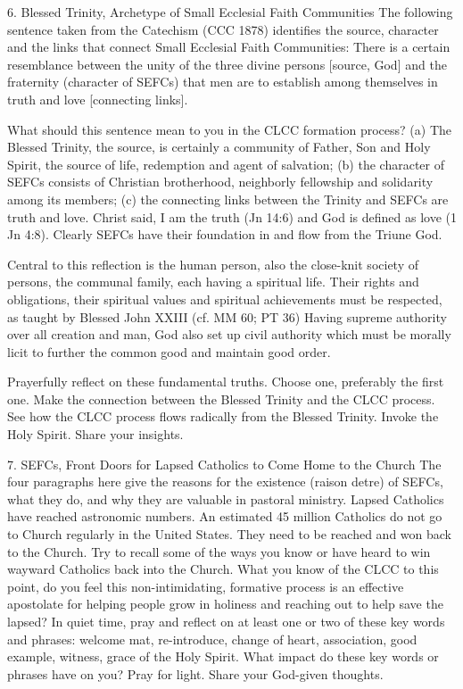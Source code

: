 \documentclass[oneside]{book}
\begin{document}
6. Blessed Trinity, Archetype of Small Ecclesial Faith Communities The following
sentence taken from the Catechism (CCC 1878) identifies the source, character
and the links that connect Small Ecclesial Faith Communities: There is a certain
resemblance between the unity of the three divine persons [source, God] and the
fraternity (character of SEFCs) that men are to establish among themselves in
truth and love [connecting links].

What should this sentence mean to you in the CLCC formation process? (a) The
Blessed Trinity, the source, is certainly a community of Father, Son and Holy
Spirit, the source of life, redemption and agent of salvation; (b) the character
of SEFCs consists of Christian brotherhood, neighborly fellowship and solidarity
among its members; (c) the connecting links between the Trinity and SEFCs are
truth and love. Christ said, I am the truth (Jn 14:6) and God is defined as love
(1 Jn 4:8). Clearly SEFCs have their foundation in and flow from the Triune God.

Central to this reflection is the human person, also the close-knit society of
persons, the communal family, each having a spiritual life. Their rights and
obligations, their spiritual values and spiritual achievements must be
respected, as taught by Blessed John XXIII (cf. MM 60; PT 36) Having supreme
authority over all creation and man, God also set up civil authority which must
be morally licit to further the common good and maintain good order.

Prayerfully reflect on these fundamental truths. Choose one, preferably the
first one. Make the connection between the Blessed Trinity and the CLCC
process. See how the CLCC process flows radically from the Blessed
Trinity. Invoke the Holy Spirit. Share your insights.

7. SEFCs, Front Doors for Lapsed Catholics to Come Home to the Church The four
paragraphs here give the reasons for the existence (raison detre) of SEFCs, what
they do, and why they are valuable in pastoral ministry. Lapsed Catholics have
reached astronomic numbers. An estimated 45 million Catholics do not go to
Church regularly in the United States. They need to be reached and won back to
the Church. Try to recall some of the ways you know or have heard to win wayward
Catholics back into the Church. What you know of the CLCC to this point, do you
feel this non-intimidating, formative process is an effective apostolate for
helping people grow in holiness and reaching out to help save the lapsed?  In
quiet time, pray and reflect on at least one or two of these key words and
phrases: welcome mat, re-introduce, change of heart, association, good example,
witness, grace of the Holy Spirit. What impact do these key words or phrases
have on you? Pray for light. Share your God-given thoughts.
\end{document}
